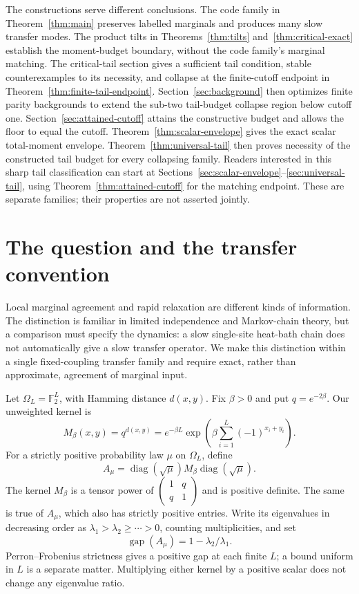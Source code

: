 \documentclass[11pt]{article}
\newcommand{\F}{\mathbb F}
\newcommand{\diag}{\operatorname{diag}}
\newcommand{\gap}{\operatorname{gap}}
\begin{document}
The constructions serve different conclusions. The code family in
Theorem~\ref{thm:main} preserves labelled marginals and produces many slow
transfer modes. The product tilts in Theorems~\ref{thm:tilts}
and~\ref{thm:critical-exact} establish the moment-budget boundary, without
the code family's marginal matching. The critical-tail section gives a sufficient
tail condition, stable counterexamples to its necessity, and collapse at
the finite-cutoff endpoint in Theorem~\ref{thm:finite-tail-endpoint}.
Section~\ref{sec:background} then optimizes finite parity backgrounds
to extend the sub-two tail-budget collapse region below cutoff one.
Section~\ref{sec:attained-cutoff} attains the constructive budget
and allows the floor to equal the cutoff. Theorem~\ref{thm:scalar-envelope}
gives the exact scalar total-moment envelope. Theorem~\ref{thm:universal-tail}
then proves necessity of the constructed tail budget for every collapsing
family. Readers interested in this sharp tail classification can start at
Sections~\ref{sec:scalar-envelope}--\ref{sec:universal-tail}, using
Theorem~\ref{thm:attained-cutoff} for the matching endpoint.
These are separate families; their properties are not asserted jointly.

\section{The question and the transfer convention}
Local marginal agreement and rapid relaxation are different kinds of
information. The distinction is familiar in limited independence and
Markov-chain theory, but a comparison must specify the dynamics: a slow
single-site heat-bath chain does not automatically give a slow transfer
operator. We make this distinction within a single fixed-coupling transfer
family and require exact, rather than approximate, agreement of marginal
input.

Let $\Omega_L=\F_2^L$, with Hamming distance $d(x,y)$. Fix $\beta>0$ and put
$q=e^{-2\beta}$. Our unweighted kernel is
\begin{equation}\label{eq:kernel}
 M_\beta(x,y)=q^{d(x,y)}
 =e^{-\beta L}\exp\!\left(\beta\sum_{i=1}^L(-1)^{x_i+y_i}\right).
\end{equation}
For a strictly positive probability law $\mu$ on $\Omega_L$, define
\begin{equation}\label{eq:weighted}
 A_\mu=\diag(\sqrt\mu)M_\beta\diag(\sqrt\mu).
\end{equation}
The kernel $M_\beta$ is a tensor power of
$\left(\begin{smallmatrix}1&q\\q&1\end{smallmatrix}\right)$ and is positive
definite. The same is true of $A_\mu$, which also has strictly positive
entries. Write its eigenvalues in decreasing order as
$\lambda_1>\lambda_2\ge\cdots>0$, counting multiplicities, and set
\[
 \gap(A_\mu)=1-\lambda_2/\lambda_1.
\]
Perron--Frobenius strictness gives a positive gap at each finite $L$; a
bound uniform in $L$ is a separate matter. Multiplying either kernel by
a positive scalar does not change any eigenvalue ratio.
\end{document}
